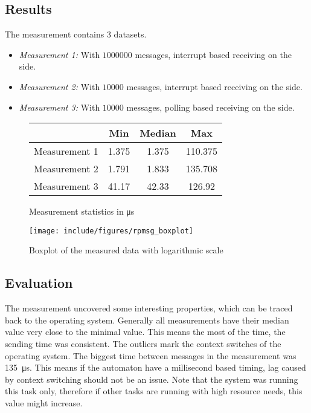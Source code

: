 \subsection{Results}

The measurement contains 3 datasets.
\begin{itemize}
	\item \emph{Measurement 1:} With $1000000$ messages, interrupt based receiving on the \pru{} side.
	\item \emph{Measurement 2:} With $10000$ messages, interrupt based receiving on the \pru{} side.
	\item \emph{Measurement 3:} With $10000$ messages, polling based receiving on the \pru{} side.
\end{itemize}

\begin{figure}
	\centering
	\caption{Measurement statistics in \unit{\micro\second}}
	\begin{tabular}{l c c c}
		\toprule
		& Min & Median & Max \\
		\midrule
		Measurement 1 & 1.375 & 1.375 & 110.375 \\
		Measurement 2 & 1.791 & 1.833 & 135.708 \\
		Measurement 3 & 41.17 & 42.33 & 126.92 \\
		\bottomrule
	\end{tabular}
\end{figure}

\begin{figure}[h]
	\centering
	\texttt{[image: include/figures/rpmsg\_boxplot]}
	\caption{Boxplot of the measured data with logarithmic scale}
\label{fig:rpmsg_boxplot}
\end{figure}

\subsection{Evaluation}

The measurement uncovered some interesting properties, which can be traced back to the operating system. Generally all measurements have their median value very close to the minimal value. This means the most of the time, the sending time was consistent. The outliers mark the context switches of the operating system. The biggest time between messages in the measurement was \qty{135}{\micro\second}. This means if the automaton have a millisecond based timing, lag caused by context switching should not be an issue. Note that the system was running this task only, therefore if other tasks are running with high resource needs, this value might increase.

